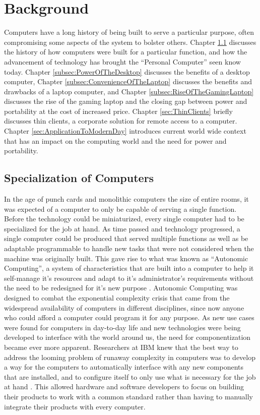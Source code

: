 \chapter{Background}

\label{Chapter2}

Computers have a long history of being built to serve a particular purpose, often compromising some aspects of the system to bolster others.
Chapter \ref{sec:SpecializationOfComputers} discusses the history of how computers were built for a particular function, and how the advancement of technology has brought the \enquote{Personal Computer} seen know today.
Chapter \ref{subsec:PowerOfTheDesktop} discusses the benefits of a desktop computer, Chapter \ref{subsec:ConvenienceOfTheLaptop} discusses the benefits and drawbacks of a laptop computer, and Chapter \ref{subsec:RiseOfTheGamingLaptop} discusses the rise of the gaming laptop and the closing gap between power and portability at the cost of increased price.
Chapter \ref{sec:ThinClients} briefly discusses thin clients, a corporate solution for remote access to a computer.
Chapter \ref{sec:ApplicationToModernDay} introduces current world wide context that has an impact on the computing world and the need for power and portability.

\section{Specialization of Computers}\label{sec:SpecializationOfComputers}

In the age of punch cards and monolithic computers the size of entire rooms, it was expected of a computer to only be capable of serving a single function.
Before the technology could be miniaturized, every single computer had to be specialized for the job at hand.
As time passed and technology progressed, a single computer could be produced that served multiple functions as well as be adaptable programmable to handle new tasks that were not considered when the machine was originally built.
This gave rise to what was known as \enquote{Autonomic Computing}, a system of characteristics that are built into a computer to help it self-manage it's resources and adapt to it's administrator's requirements without the need to be redesigned for it's new purpose \cite{AutonomicComputing}.
Autonomic Computing was designed to combat the exponential complexity crisis that came from the widespread availability of computers in different disciplines, since now anyone who could afford a computer could program it for any purpose.
As new use cases were found for computers in day-to-day life and new technologies were being developed to interface with the world around us, the need for componentization became ever more apparent.
Researchers at IBM knew that the best way to address the looming problem of runaway complexity in computers was to develop a way for the computers to automatically interface with any new components that are installed, and to configure itself to only use what is necessary for the job at hand \cite{AutonomicComputing}.
This allowed hardware and software developers to focus on building their products to work with a common standard rather than having to manually integrate their products with every computer.

